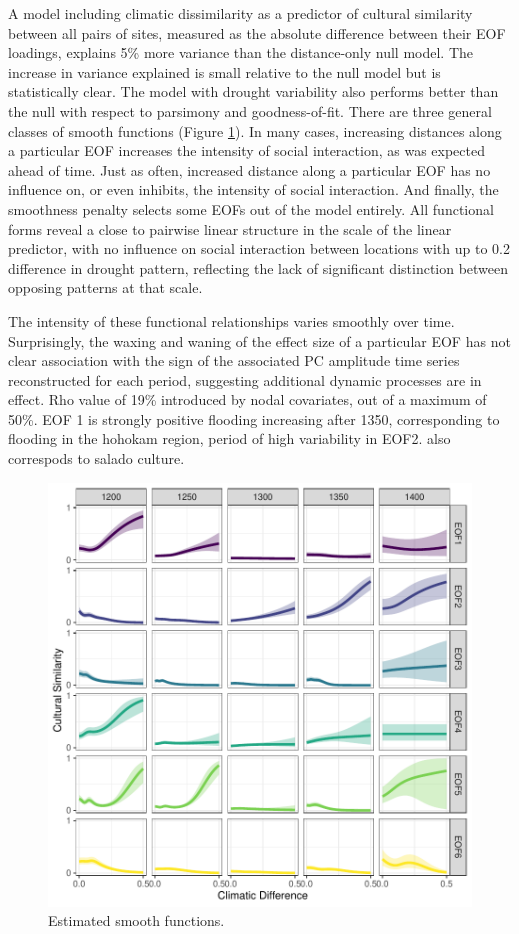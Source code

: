 \documentclass[10pt]{iopart}
\begin{document}
A model including climatic dissimilarity as a predictor of cultural similarity between all pairs of sites, measured as the absolute difference between their EOF loadings, explains 5\% more variance than the distance-only null model. The increase in variance explained is small relative to the null model but is statistically clear. The model with drought variability also performs better than the null with respect to parsimony and goodness-of-fit. There are three general classes of smooth functions (Figure \ref{fig:smooths}). In many cases, increasing distances along a particular EOF increases the intensity of social interaction, as was expected ahead of time. Just as often, increased distance along a particular EOF has no influence on, or even inhibits, the intensity of social interaction. And finally, the smoothness penalty selects some EOFs out of the model entirely. All functional forms reveal a close to pairwise linear structure in the scale of the linear predictor, with no influence on social interaction between locations with up to 0.2 difference in drought pattern, reflecting the lack of significant distinction between opposing patterns at that scale. 

The intensity of these functional relationships varies smoothly over time. Surprisingly, the waxing and waning of the effect size of a particular EOF has not clear association with the sign of the associated PC amplitude time series reconstructed for each period, suggesting additional dynamic processes are in effect. Rho value of 19\% introduced by nodal covariates, out of a maximum of 50\%. EOF 1 is strongly positive flooding increasing after 1350, corresponding to flooding in the hohokam region, period of high variability in EOF2. also correspods to salado culture.

\begin{figure}[!htbp]
\centering
\includegraphics[width=.8\linewidth]{figures/smooths.pdf}
\caption{Estimated smooth functions.}
\label{fig:smooths}
\end{figure}
\end{document}
